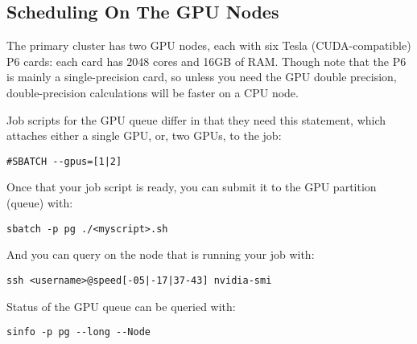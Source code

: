 
\subsection{Scheduling On The GPU Nodes}

The primary cluster has two GPU nodes, each with six Tesla (CUDA-compatible) P6
cards: each card has 2048 cores and 16GB of RAM. Though note that the P6
is mainly a single-precision card, so unless you need the GPU double
precision, double-precision calculations will be faster on a CPU node.

Job scripts for the GPU queue differ in that they
%
%
need this statement, which attaches either a single GPU, or, two
GPUs, to the job:

\begin{verbatim}
#SBATCH --gpus=[1|2]
\end{verbatim}


Once that your job script is ready, you can submit it to the GPU partition (queue)
with:

\begin{verbatim}
sbatch -p pg ./<myscript>.sh
\end{verbatim}

And you can query  on the node that is running your job with:

\begin{verbatim}
ssh <username>@speed[-05|-17|37-43] nvidia-smi
\end{verbatim}

Status of the GPU queue can be queried with:

\begin{verbatim}
sinfo -p pg --long --Node
\end{verbatim}

